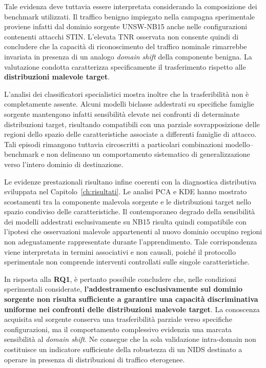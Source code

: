Tale evidenza deve tuttavia essere interpretata considerando la composizione dei benchmark utilizzati.
Il traffico benigno impiegato nella campagna sperimentale proviene infatti dal dominio sorgente UNSW-NB15 anche nelle configurazioni contenenti attacchi STIN.
L'elevata TNR osservata non consente quindi di concludere che la capacità di riconoscimento del traffico nominale rimarrebbe invariata in presenza di un analogo \textit{domain shift} della componente benigna.
La valutazione condotta caratterizza specificamente il trasferimento rispetto alle \textbf{distribuzioni malevole target}.

L'analisi dei classificatori specialistici mostra inoltre che la trasferibilità non è completamente assente.
Alcuni modelli biclasse addestrati su specifiche famiglie sorgente mantengono infatti sensibilità elevate nei confronti di determinate distribuzioni target, risultando compatibili con una parziale sovrapposizione delle regioni dello spazio delle caratteristiche associate a differenti famiglie di attacco.
Tali episodi rimangono tuttavia circoscritti a particolari combinazioni modello--benchmark e non delineano un comportamento sistematico di generalizzazione verso l'intero dominio di destinazione.

Le evidenze prestazionali risultano infine coerenti con la diagnostica distributiva sviluppata nel Capitolo~\ref{ch:risultati}.
Le analisi PCA e KDE hanno mostrato scostamenti tra la componente malevola sorgente e le distribuzioni target nello spazio condiviso delle caratteristiche.
Il contemporaneo degrado della sensibilità dei modelli addestrati esclusivamente su NB15 risulta quindi compatibile con l'ipotesi che osservazioni malevole appartenenti al nuovo dominio occupino regioni non adeguatamente rappresentate durante l'apprendimento.
Tale corrispondenza viene interpretata in termini associativi e non causali, poiché il protocollo sperimentale non comprende interventi controllati sulle singole caratteristiche.

In risposta alla \textbf{RQ1}, è pertanto possibile concludere che, nelle condizioni sperimentali considerate, \textbf{l'addestramento esclusivamente sul dominio sorgente non risulta sufficiente a garantire una capacità discriminativa uniforme nei confronti delle distribuzioni malevole target}.
La conoscenza acquisita sul sorgente conserva una trasferibilità parziale verso specifiche configurazioni, ma il comportamento complessivo evidenzia una marcata sensibilità al \textit{domain shift}.
Ne consegue che la sola validazione intra-domain non costituisce un indicatore sufficiente della robustezza di un NIDS destinato a operare in presenza di distribuzioni di traffico eterogenee.


